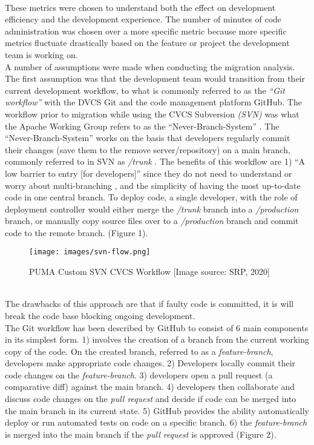 \documentclass{article}
\begin{document}
{\\
\indent
These metrics were chosen to understand both the effect on development efficiency and the development experience. The number of minutes of code administration was chosen over a more specific metric because more specific metrics fluctuate drastically based on the feature or project the development team is working on.
\\
\indent
A number of assumptions were made when conducting the migration analysis. The first assumption was that the development team would transition from their current development workflow, to what is commonly referred to as the \textit{“Git workflow”} with the DVCS Git and the code management platform GitHub. The workflow prior to migration while using the CVCS Subversion \textit{(SVN)} was what the Apache Working Group refers to as the “Never-Branch-System” \cite{software-best-practices}. The “Never-Branch-System” works on the basis that developers regularly commit their changes (save them to the remove server/repository) on a main branch, commonly referred to in SVN as \textit{/trunk} \cite{software-best-practices}. The benefits of this workflow are 1) “A low barrier to entry [for developers]” since they do not need to understand or worry about multi-branching \cite{software-best-practices}, and the simplicity of having the most up-to-date code in one central branch. To deploy code, a single developer, with the role of deployment controller would either merge the \textit{/trunk} branch into a \textit{/production} branch, or manually copy source files over to a \textit{/production} branch and commit code to the remote branch. (Figure 1). 
\begin{figure}[h]
\centering
\texttt{[image: images/svn-flow.png]}
\caption{PUMA Custom SVN CVCS Workflow [Image source: SRP, 2020]}
\end{figure}
\\
\indent
The drawbacks of this approach are that if faulty code is committed, it is will break the code base blocking ongoing development.
\\
\indent
The Git workflow has been described by GitHub to consist of 6 main components in its simplest form. \cite{understanding-git-workflow} 1) involves the creation of a branch from the current working copy of the code. On the created branch, referred to as a \textit{feature-branch}, developers make appropriate code changes. 2) Developers locally commit their code changes on the \textit{feature-branch}. 3) developers open a pull request (a comparative diff) against the main branch. 4) developers then collaborate and discuss code changes on the \textit{pull request} and decide if code can be merged into the main branch in its current state. 5) GitHub provides the ability automatically deploy or run automated tests on code on a specific branch. 6) the \textit{feature-branch} is merged into the main branch if the \textit{pull request} is approved (Figure 2). 
}
\end{document}
